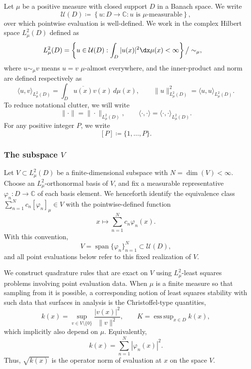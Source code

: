 \documentclass[10pt,dvipsnames]{amsart}
\begin{document}
Let \(\mu\) be a positive measure with closed support \(D\) in a Banach space. 
We write
\begin{equation}
\label{eq:U-def}
    \mathcal U(D)
    \coloneqq
    \left\{
        u:D\to\mathbb C:
        u \text{ is \(\mu\)-measurable}
    \right\},
\end{equation}
over which pointwise evaluation is well-defined.
We work in the complex Hilbert space $L^2_\mu(D)$ defined as
\begin{align}
\label{eq:l2mu-def}
    L^2_\mu(D)
    &=
    \left\{
        u \in \mathcal{U}(D) :
        \int_D |u(x)|^2 \dx\mu(x)<\infty
    \right\} \big/ \sim_{\mu},
\end{align}
where $u\sim_\mu v$ means $u=v$ $\mu$-almost everywhere, and the inner-product and norm are defined respectively as
\begin{equation}
\label{eq:l2mu-normip-def}
    \langle u,v\rangle_{L^2_\mu(D)}
    =
    \int_D\overline{u(x)}v(x)\,d\mu(x),
    \qquad
    \|u\|_{L^2_\mu(D)}^2
    =
    \langle u,u\rangle_{L^2_\mu(D)}.
\end{equation}
To reduce notational clutter, we will write
\[
    \|\cdot\|=\|\cdot\|_{L^2_\mu(D)},
    \qquad
    \langle\cdot,\cdot\rangle
    =
    \langle\cdot,\cdot\rangle_{L^2_\mu(D)}.
\]
For any positive integer \(P\), we write
\begin{equation}
\label{eq:index-set-def}
    [P]
    \coloneqq
    \{1,\ldots,P\}.
\end{equation}

\subsubsection{The subspace \(V\)}
\label{sssec:preliminaries-V}

Let \(V\subset L^2_\mu(D)\) be a finite-dimensional subspace with
\(
    N=\dim(V) < \infty.
\)
Choose an \(L^2_\mu\)-orthonormal basis of \(V\), and fix a measurable representative \(\varphi_n:D\to\mathbb C\) of each basis element. We henceforth identify the equivalence class \(\sum_{n=1}^N c_n[\varphi_n]_\mu\in V\) with the pointwise-defined function
\[
x\longmapsto\sum_{n=1}^N c_n\varphi_n(x).
\]With this convention,
\begin{equation}
\label{eq:V-basis-def}
V=\operatorname{span}\{\varphi_n\}_{n=1}^N\subset\mathcal U(D),
\end{equation}
and all point evaluations below refer to this fixed realization of \(V\).

We construct quadrature rules that are exact on \(V\) using $L^2_\mu$-least
squares problems involving point evaluation data. When $\mu$ is a finite
measure so that sampling from it is possible, a corresponding notion of least
squares stability with such data that surfaces in analysis is the
Christoffel-type quantities,
\begin{equation}
\label{eq:k-def}
    k(x)
    =
    \sup_{v\in V\setminus\{0\}}
    \frac{|v(x)|^2}{\|v\|^2},
    \qquad
    K= \mathop{\mathrm{ess\,sup}}_{x \in D} k(x),
\end{equation}
which implicitly also depend on $\mu$.
Equivalently,
\[
    k(x)=\sum_{n=1}^N |\varphi_n(x)|^2.
\]
Thus, \(\sqrt{k(x)}\) is the operator norm of evaluation at \(x\) on the space \(V\).
\end{document}
